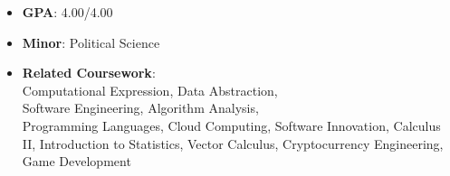 \documentclass[10pt,a4paper,ragged2e]{altacv}
\begin{document}
\tagline{}

\begin{fullwidth}
  \makecvheader
\end{fullwidth}




\begin{itemize}
  \item \textbf{GPA}: 4.00/4.00
  \item \textbf{Minor}: Political Science
  \item \textbf{Related Coursework}:\\ Computational Expression, Data
        Abstraction, \\ Software Engineering, Algorithm Analysis, \\ Programming
        Languages, Cloud Computing, Software Innovation, Calculus II, Introduction to
        Statistics, Vector Calculus, Cryptocurrency Engineering, Game Development
\end{itemize}
\end{document}
